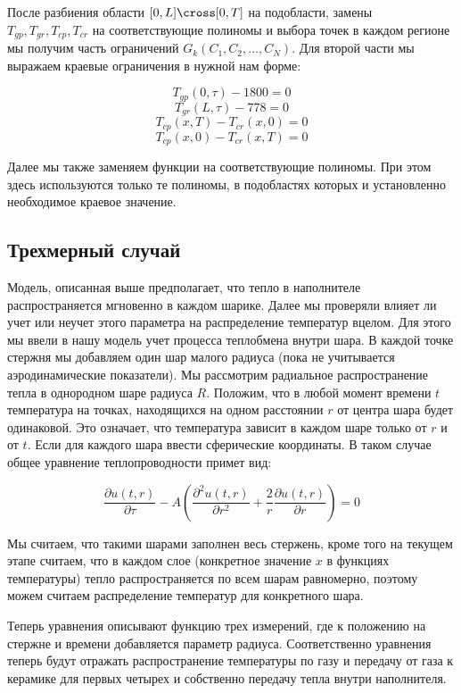 \documentclass[a4paper,12pt]{article}
\begin{document}
После разбиения области $[0,L] \cross [0,T]$ на подобласти,
замены $T_{gp}, T_{gr}, T_{cp}, T_{cr}$ на соответствующие полиномы
и выбора точек в каждом регионе мы получим часть
ограничений $G_k(C_1,C_2,\ldots,C_N)$. Для второй части мы выражаем
краевые ограничения в нужной нам форме:

$$T_{gp}(0,\tau) - 1800 = 0$$
$$T_{gr}(L,\tau) - 778 = 0$$
$$T_{cp}(x,T) - T_{cr}(x,0) = 0$$
$$T_{cp}(x,0) - T_{cr}(x,T) = 0$$

Далее мы также заменяем функции на соответствующие полиномы. При этом
здесь используются только те полиномы, в подобластях которых и
установленно необходимое краевое значение.

\subsection{Трехмерный случай}

Модель, описанная выше предполагает, что тепло в наполнителе
распространяется мгновенно в каждом шарике. Далее мы проверяли влияет
ли учет или неучет этого параметра на распределение температур вцелом.
Для этого мы ввели в нашу модель учет процесса теплобмена внутри
шара. В каждой точке стержня мы добавляем один шар малого радиуса
(пока не учитывается аэродинамические показатели).  Мы рассмотрим
радиальное распространение тепла в однородном шаре
радиуса $R$. Положим, что в любой момент времени $t$ температура
на точках, находящихся на одном расстоянии $r$ от центра шара будет
одинаковой. Это означает, что температура зависит в каждом шаре только
от $r$ и от $t$. Если для каждого шара ввести сферические
координаты. В таком случае общее уравнение теплопроводности примет
вид:

$$\frac{\partial u(t,r)}{\partial \tau} - A\left(\frac{\partial^2 u(t,r)}{\partial r^2} + \frac{2}{r} \frac{\partial u(t,r)}{\partial r}\right) = 0$$

Мы считаем, что такими шарами заполнен весь стержень, кроме того на
текущем этапе считаем, что в каждом слое (конкретное значение $x$ в
функциях температуры) тепло распространяется по всем шарам равномерно,
поэтому можем считаем распределение температур для конкретного шара.

Теперь уравнения описывают функцию трех измерений, где к положению на
стержне и времени добавляется параметр радиуса. Соответственно
уравнения теперь будут отражать распространение температуры по газу и
передачу от газа к керамике для первых четырех и собственно передачу
тепла внутри наполнителя.
\end{document}
